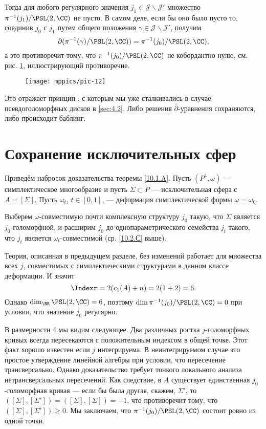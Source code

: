 Тогда для любого регулярного значения $j_1 \in \mathcal{J} \backslash \mathcal{J}'$ множество $\pi^{-1} (j_1)/\PSL(2, \CC)$ не пусто.
В самом деле, если бы оно было пусто то, соединив $j_0$ с $j_1$ путем общего положения $\gamma \in \mathcal{J} \backslash\mathcal{J}'$, получим
\[\partial(\pi^{-1}(\gamma)/\PSL(2,\CC))
=
\pi^{-1}(j_0)/\PSL(2,\CC),
\]
а это противоречит тому, что $\pi^{-1} (j_0)/\PSL(2, \CC)$ не кобордантно нулю, см. рис. \ref{pic-12}, иллюстрирующий противоречие.

\begin{figure}[ht!]
\vskip0mm
\centering
\texttt{[image: mppics/pic-12]}
\caption{}\label{pic-12}
\vskip0mm
\end{figure}

Это отражает принцип , с которым мы уже сталкивались в случае псевдоголоморфных дисков в \ref{sec:4.2}.
Либо решения $\bar\partial$-уравнения сохраняются, либо происходит баблинг.

\section{Сохранение исключительных сфер}

Приведём набросок доказательства теоремы \ref{10.1.A}.
Пусть $(P^4, \omega)$ --- симплектическое многообразие и пусть $\Sigma \subset P$ --- исключительная сфера с $A = [\Sigma]$.
Пусть $\omega_t$, $t \in [0, 1]$, --- деформация симплектической формы $\omega = \omega_0$.

Выберем $\omega$-совместимую почти комплексную структуру $j_0$ такую, что $\Sigma$ является $j_0$-голоморфной, и расширим $j_0$ до однопараметрического семейства $j_t$ такого, что $j_t$ является $\omega_t$-совместимой (ср. \ref{10.2.С} выше).

Теория, описанная в предыдущем разделе, без изменений работает для множества всех $j$, совместимых с симплектическими структурами в данном классе деформации.
И значит
\[\Index\pi = 2(c_1 (A) + n) = 2(1 + 2) = 6.\]
Однако $\dim_\RR\PSL(2, \CC) = 6$, поэтому $\dim \pi^{-1} (j_0)/\PSL(2, \CC) = 0$ при условии, что значение $j_0$ регулярно.

В размерности 4 мы видим следующее.
Два различных ростка $j$-голоморфных кривых всегда пересекаются с положительным индексом в общей точке.
Этот факт хорошо известен если $j$ интегрируема.
В неинтегрируемом случае это простое утверждение линейной алгебры при условии, что пересечение трансверсально.
Однако доказательство требует тонкого локального анализа нетрансверсальных пересечений.
Как следствие, в $A$ существует единственная $j_0$-голоморфная кривая --- если бы была другая, скажем, $\Sigma'$, то $([\Sigma], [\Sigma']) = ([\Sigma], [\Sigma]) = -1$, что противоречит тому, что $([\Sigma], [\Sigma']) \ge 0$.
Мы заключаем, что $\pi^{-1} (j_0)/\PSL(2, \CC)$ состоит ровно из одной точки.

